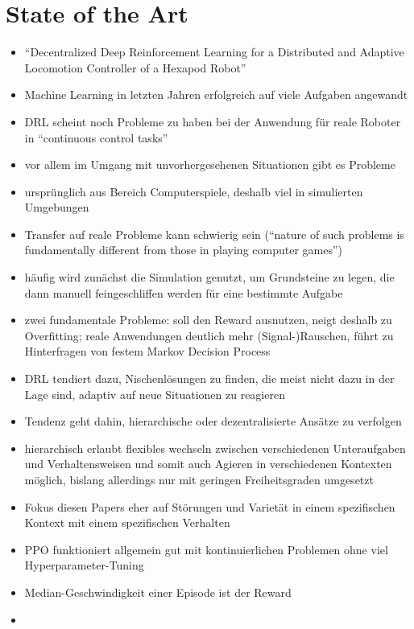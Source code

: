 \chapter{State of the Art}


\begin{itemize}
    \item \enquote{Decentralized Deep Reinforcement Learning for a Distributed and Adaptive Locomotion Controller of a Hexapod Robot}
    \item Machine Learning in letzten Jahren erfolgreich auf viele Aufgaben angewandt
    \item DRL scheint noch Probleme zu haben bei der Anwendung für reale Roboter in \enquote{continuous control tasks}
    \item vor allem im Umgang mit unvorhergesehenen Situationen gibt es Probleme
    
    \item ursprünglich aus Bereich Computerspiele, deshalb viel in simulierten Umgebungen
    \item Transfer auf reale Probleme kann schwierig sein (\enquote{nature of such problems is fundamentally different from those in playing computer games})
    \item häufig wird zunächst die Simulation genutzt, um Grundsteine zu legen, die dann manuell feingeschliffen werden für eine bestimmte Aufgabe
    \item zwei fundamentale Probleme: soll den Reward ausnutzen, neigt deshalb zu Overfitting; reale Anwendungen deutlich mehr (Signal-)Rauschen, führt zu Hinterfragen von festem Markov Decision Process
    \item DRL tendiert dazu, Nischenlösungen zu finden, die meist nicht dazu in der Lage sind, adaptiv auf neue Situationen zu reagieren
    
    \item Tendenz geht dahin, hierarchische oder dezentralisierte Ansätze zu verfolgen
    \item hierarchisch erlaubt flexibles wechseln zwischen verschiedenen Unteraufgaben und Verhaltensweisen und somit auch Agieren in verschiedenen Kontexten möglich, bislang allerdings nur mit geringen Freiheitsgraden umgesetzt
    \item Fokus diesen Papers eher auf Störungen und Varietät in einem spezifischen Kontext mit einem spezifischen Verhalten
    
    \item PPO funktioniert allgemein gut mit kontinuierlichen Problemen ohne viel Hyperparameter-Tuning
    \item Median-Geschwindigkeit einer Episode ist der Reward
    \item \cite{schilling2020decentralized}
\end{itemize}

